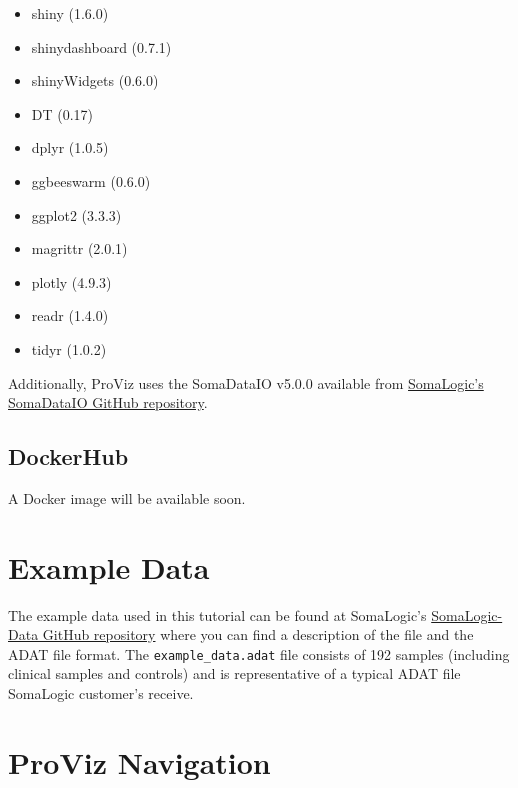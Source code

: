 \documentclass[
]{book}
\providecommand{\tightlist}{%
  \setlength{\itemsep}{0pt}\setlength{\parskip}{0pt}}
\begin{document}
\begin{itemize}
\tightlist
\item
  shiny (1.6.0)
\item
  shinydashboard (0.7.1)
\item
  shinyWidgets (0.6.0)
\item
  DT (0.17)
\item
  dplyr (1.0.5)
\item
  ggbeeswarm (0.6.0)
\item
  ggplot2 (3.3.3)
\item
  magrittr (2.0.1)
\item
  plotly (4.9.3)
\item
  readr (1.4.0)
\item
  tidyr (1.0.2)
\end{itemize}

Additionally, ProViz uses the SomaDataIO v5.0.0 available from \href{https://github.com/SomaLogic/SomaDataIO}{SomaLogic's SomaDataIO GitHub repository}.

\hypertarget{dockerhub}{%
\subsection{DockerHub}\label{dockerhub}}

A Docker image will be available soon.

\hypertarget{example-data}{%
\section{Example Data}\label{example-data}}

The example data used in this tutorial can be found at SomaLogic's \href{https://github.com/SomaLogic/SomaLogic-Data}{SomaLogic-Data GitHub repository} where you can find a description of the file and the ADAT file format. The \texttt{example\_data.adat} file consists of 192 samples (including clinical samples and controls) and is representative of a typical ADAT file SomaLogic customer's receive.

\hypertarget{proviz-navigation}{%
\section{ProViz Navigation}\label{proviz-navigation}}
\end{document}
